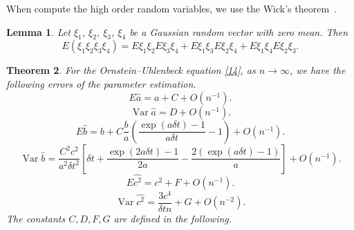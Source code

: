 \documentclass[12pt,reqno, a4paper]{article}
\newtheorem{theorem}{Theorem}[section]
\newtheorem{lemma}[theorem]{Lemma}
\numberwithin{equation}{section}
\begin{document}
When compute the high order random variables, we use the Wick's theorem~\cite{Jan}.
\begin{lemma}Let $\xi_1$,  $\xi_2$,  $\xi_3$,  $\xi_4$ be a Gaussian random vector with zero mean. Then
$$E(\xi_1\xi_2\xi_3\xi_4)=E\xi_1\xi_2E\xi_3\xi_4+E\xi_1\xi_3E\xi_2\xi_4+E\xi_1\xi_4E\xi_2\xi_3.$$ \end{lemma}
\begin{theorem}\label{th1}For the Ornstein--Uhlenbeck equation \eqref{14}, as $n\to \infty$, we have the following errors of the parameter estimation.
$$E\hat{a}=a+C+O(n^{-1}).$$
 $$\operatorname{Var}\hat{a}=D+O(n^{-1}).$$
$$E\hat{b}=b+C\frac b a( \frac {\exp(a\delta t)-1}{a\delta t}-1)+O(n^{-1}).$$
  $$\operatorname{Var}\hat{b}=\frac {C^2c^2}{a^2\delta t^2 }[\delta t+\frac {\exp(2a \delta t)-1}{2a}-\frac {2(\exp(a \delta t)-1)}{a}]+O(n^{-1}).$$
  $$E\hat{c^2}=c^2+F+O(n^{-1}).$$
  $$\operatorname{Var}\hat{c^2}=\frac {3c^4}{\delta t n}+G+O(n^{-2}).$$
 The constants $C, D, F, G$ are defined in the following.
\end{theorem}
\end{document}
